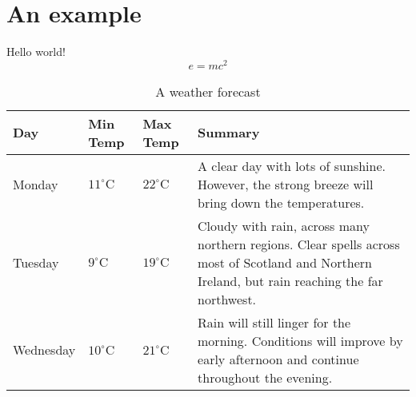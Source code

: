 \documentclass[
    color,   %
	table,   %
    twoside, %
]{fithesis/fithesis3}
\begin{document}
  \chapter{An example}
  Hello world!
  \begin{equation}
    \tag{Mass--energy equivalence} e=mc^2
  \end{equation}
  \begin{table}[!h]
    \begin{tabularx}{\textwidth}{lllX}
      \toprule
      Day & Min Temp & Max Temp & Summary \\
      \midrule
      Monday & $11^{\circ}\mathrm{C}$ & $22^\circ\mathrm{C}$
      & A clear day with lots of sunshine. However, the
      strong breeze will bring down the temperatures. \\
      Tuesday & $9^{\circ}\mathrm{C}$ & $19^\circ\mathrm{C}$
      & Cloudy with rain, across many northern regions. Clear
      spells across most of Scotland and Northern Ireland,
      but rain reaching the far northwest. \\
      Wednesday & $10^{\circ}\mathrm{C}$ &
      $21^\circ\mathrm{C}$ & Rain will still linger for the
      morning. Conditions will improve by early afternoon
      and continue throughout the evening.\\
      \bottomrule
    \end{tabularx}
    \caption{A weather forecast}
  \end{table}
\end{document}
